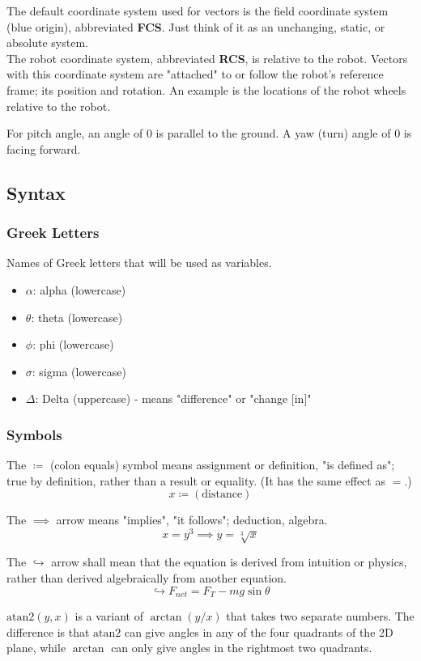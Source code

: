 \documentclass{article}
\begin{document}
The default coordinate system used for vectors is the field coordinate system (blue origin), abbreviated \textbf{FCS}. Just think of it as an unchanging, static, or absolute system. \\
The robot coordinate system, abbreviated \textbf{RCS}, is relative to the robot. Vectors with this coordinate system are "attached" to or follow the robot's reference frame; its position and rotation. An example is the locations of the robot wheels relative to the robot.

For pitch angle, an angle of $0$ is parallel to the ground. A yaw (turn) angle of $0$ is facing forward.

\subsection*{Syntax}

\subsubsection*{Greek Letters}
Names of Greek letters that will be used as variables.
\begin{itemize}
    \item $\alpha$: alpha (lowercase)
    \item $\theta$: theta (lowercase)
    \item $\phi$: phi (lowercase)
    \item $\sigma$: sigma (lowercase)
    \item $\Delta$: Delta (uppercase) - means "difference" or "change [in]"
\end{itemize}

\subsubsection*{Symbols}
The $\coloneqq$ (colon equals) symbol means assignment or definition, "is defined as"; true by definition, rather than a result or equality. (It has the same effect as $=$.)
\[ x\coloneqq(\text{distance}) \]

The $\implies$ arrow means "implies", "it follows"; deduction, algebra.
\[ x=y^3\implies y=\sqrt[3]{x} \]

The $\hookrightarrow$ arrow shall mean that the equation is derived from intuition or physics, rather than derived algebraically from another equation.
\[ \hookrightarrow F_{net}=F_T-mg\sin\theta \]

$\text{atan2}(y,x)$ is a variant of $\arctan(y/x)$ that takes two separate numbers. The difference is that $\text{atan2}$ can give angles in any of the four quadrants of the 2D plane, while $\arctan$ can only give angles in the rightmost two quadrants.
\end{document}
